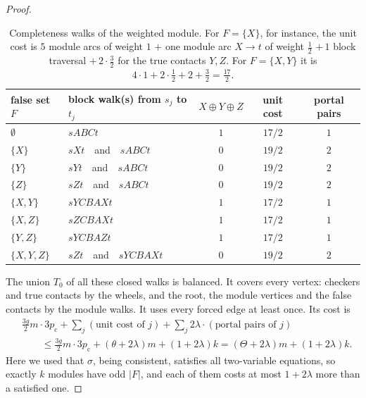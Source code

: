 \documentclass[11pt]{amsart}
\theoremstyle{definition}
\theoremstyle{remark}
\numberwithin{equation}{section}
\newcommand{\pc}{p_{\mathrm{c}}}
\begin{document}
\begin{proof}
\begin{table}[ht]
\centering
\begin{tabular}{@{}llccc@{}}
\toprule
false set $F$ & block walk(s) from $s_j$ to $t_j$ & $X\oplus Y\oplus Z$ & unit cost & portal pairs\\
\midrule
$\emptyset$ & $sABCt$ & $1$ & $17/2$ & $1$\\
$\{X\}$ & $sXt$\ \ and\ \ $sABCt$ & $0$ & $19/2$ & $2$\\
$\{Y\}$ & $sYt$\ \ and\ \ $sABCt$ & $0$ & $19/2$ & $2$\\
$\{Z\}$ & $sZt$\ \ and\ \ $sABCt$ & $0$ & $19/2$ & $2$\\
$\{X,Y\}$ & $sYCBAXt$ & $1$ & $17/2$ & $1$\\
$\{X,Z\}$ & $sZCBAXt$ & $1$ & $17/2$ & $1$\\
$\{Y,Z\}$ & $sYCBAZt$ & $1$ & $17/2$ & $1$\\
$\{X,Y,Z\}$ & $sZt$\ \ and\ \ $sYCBAXt$ & $0$ & $19/2$ & $2$\\
\bottomrule
\end{tabular}
\medskip
\caption{Completeness walks of the weighted module. For $F=\{X\}$, for instance, the unit cost is $5$ module arcs of weight $1$ $+$ one module arc $X\to t$ of weight $\frac12$ $+\,1$ block traversal $+\,2\cdot\frac32$ for the true contacts $Y,Z$. For $F=\{X,Y\}$ it is $4\cdot1+2\cdot\frac12+2+\frac32=\frac{17}{2}$.}
\label{tab:wwalks}
\end{table}

The union $T_0$ of all these closed walks is balanced. It covers every vertex: checkers and true contacts by the wheels, and the root, the module vertices and the false contacts by the module walks. It uses every forced edge at least once. Its cost is
\begin{align*}
&\tfrac{3g}{2}m\cdot3\pc+\sum_j(\text{unit cost of }j)+\sum_j2\lambda\cdot(\text{portal pairs of }j)\\
&\qquad\le \tfrac{3g}{2}m\cdot3\pc+(\theta+2\lambda)m+(1+2\lambda)k=(\Theta+2\lambda)m+(1+2\lambda)k.
\end{align*}
Here we used that $\sigma$, being consistent, satisfies all two-variable equations, so exactly $k$ modules have odd $|F|$, and each of them costs at most $1+2\lambda$ more than a satisfied one.


\end{proof}
\end{document}
